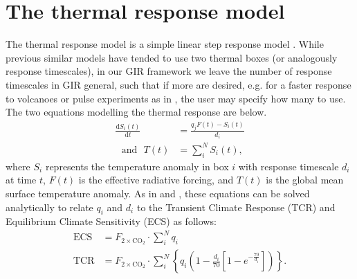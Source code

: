 \documentclass[gmd, manuscript]{copernicus}
\begin{document}
\section{The thermal response model}
The thermal response model is a simple linear step response model \citep{Good2011}. While previous similar models have tended to use two thermal boxes (or analogously response timescales), in our GIR framework we leave the number of response timescales in GIR general, such that if more are desired, e.g. for a faster response to volcanoes or pulse experiments as in \cite{Tsutsui2017}, the user may specify how many to use. The two equations modelling the thermal response are below.
\begin{align}
    \frac{\text{d}S_i(t)}{\text{d}t} &= \frac{q_jF(t) - S_i(t)}{d_i} \label{eq_thermbox}\\
    \text{~~and~~}T(t) &= \sum_{i}^{N}S_i(t), \label{eq_temp}
\end{align}
where $S_i$ represents the temperature anomaly in box $i$ with response timescale $d_i$ at time $t$, $F(t)$ is the effective radiative forcing, and $T(t)$ is the global mean surface temperature anomaly. As in \cite{Millar2016} and \cite{Tsutsui2017}, these equations can be solved analytically to relate $q_i$ and $d_i$ to the Transient Climate Response (TCR) and Equilibrium Climate Sensitivity (ECS) \citep{Collins2013} as follows:
\begin{align}
    \text{ECS}&=F_{2\times \text{CO}_2} \cdot \sum_i^N q_i \label{eq_ECS}\\
    \text{TCR}&=F_{2\times \text{CO}_2} \cdot \sum_i^N \left\{q_i\left(1-\frac{d_i}{70}\left[1-e^{-\frac{70}{d_i}}\right]\right)\right\}. \label{eq_ECS}
\end{align}
\end{document}
